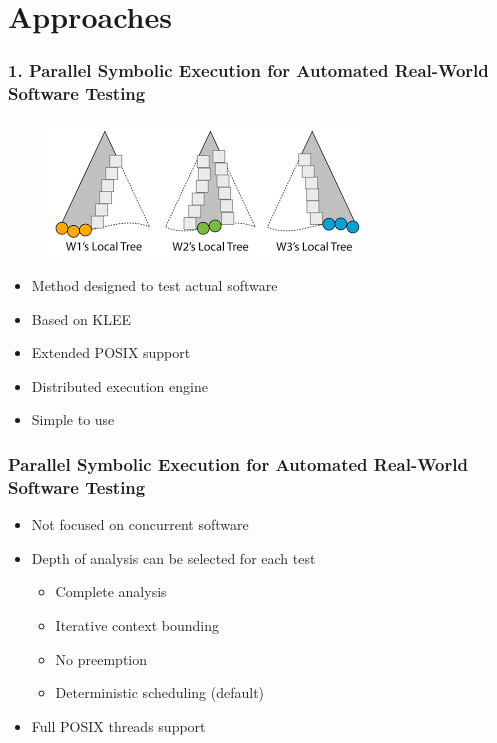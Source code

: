 \documentclass{beamer}
\begin{document}
	\section{Approaches}
	
	
	
	\begin{frame}
		\frametitle{1. Parallel Symbolic Execution for Automated Real-World Software Testing \cite{base3}}
		
		\begin{figure}[htbp]
			\centering
			\includegraphics[scale=0.5]{cloud9}
		\end{figure}
		
		\begin{itemize}
			\item Method designed to test actual software
			\item Based on KLEE
			\item Extended POSIX support
			\item Distributed execution engine
			\item Simple to use
		\end{itemize}
	\end{frame}
	
	\begin{frame}
		\frametitle{Parallel Symbolic Execution for Automated Real-World Software Testing \cite{base3}}
		
		\begin{itemize}
			\item Not focused on concurrent software
			\item Depth of analysis can be selected for each test
			\begin{itemize}
				\item Complete analysis
				\item Iterative context bounding
				\item No preemption
				\item Deterministic scheduling (default)
			\end{itemize}
			\item Full POSIX threads support
		\end{itemize}
	\end{frame}
	
\end{document}
